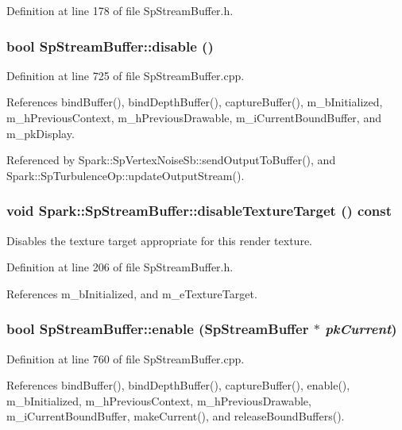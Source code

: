 Definition at line 178 of file Sp\-Stream\-Buffer.h.
\subsubsection{\setlength{\rightskip}{0pt plus 5cm}bool Sp\-Stream\-Buffer::disable ()}\label{classSpark_1_1SpStreamBuffer_a8}


Definition at line 725 of file Sp\-Stream\-Buffer.cpp.

References bind\-Buffer(), bind\-Depth\-Buffer(), capture\-Buffer(), m\_\-b\-Initialized, m\_\-h\-Previous\-Context, m\_\-h\-Previous\-Drawable, m\_\-i\-Current\-Bound\-Buffer, and m\_\-pk\-Display.

Referenced by Spark::Sp\-Vertex\-Noise\-Sb::send\-Output\-To\-Buffer(), and Spark::Sp\-Turbulence\-Op::update\-Output\-Stream().
\subsubsection{\setlength{\rightskip}{0pt plus 5cm}void Spark::Sp\-Stream\-Buffer::disable\-Texture\-Target () const\hspace{0.3cm}{\tt  [inline]}}\label{classSpark_1_1SpStreamBuffer_a14}


Disables the texture target appropriate for this render texture. 

Definition at line 206 of file Sp\-Stream\-Buffer.h.

References m\_\-b\-Initialized, and m\_\-e\-Texture\-Target.
\subsubsection{\setlength{\rightskip}{0pt plus 5cm}bool Sp\-Stream\-Buffer::enable ({\bf Sp\-Stream\-Buffer} $\ast$ {\em pk\-Current})}\label{classSpark_1_1SpStreamBuffer_a7}


Definition at line 760 of file Sp\-Stream\-Buffer.cpp.

References bind\-Buffer(), bind\-Depth\-Buffer(), capture\-Buffer(), enable(), m\_\-b\-Initialized, m\_\-h\-Previous\-Context, m\_\-h\-Previous\-Drawable, m\_\-i\-Current\-Bound\-Buffer, make\-Current(), and release\-Bound\-Buffers().
